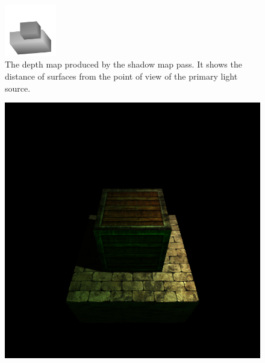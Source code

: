 \documentclass[format=sigconf]{acmart}
\begin{document}
\begin{figure}[h]
  \begin{center}
    \includegraphics[width=0.2\textwidth]{pipeline-shadow.png}
  \end{center}
  \caption{The depth map produced by the shadow map pass. It shows the distance of surfaces from the point of view of the primary light source.}
  \label{fig:pipeline-shadow}
\end{figure}

\begin{figure}[h]
  \begin{center}
    \begin{minipage}{.2\textwidth}
      \includegraphics[width=1.0\textwidth]{pipeline-lighting.png}
    \end{minipage}
    \begin{minipage}{.2\textwidth}

\end{minipage}
\end{center}
\end{figure}
\end{document}
